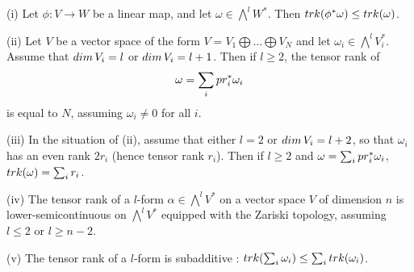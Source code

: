 \documentclass[10pt,a4paper]{amsart}
\begin{document}
\begin{lemm}\label{lerankprime} (i) Let $\phi: V\rightarrow W$ be a linear map, and let $\omega\in\bigwedge^l W^*$. Then ${\rm trk}(\phi^*\omega)\leq {\rm trk}(\omega)$.

(ii) Let $V$ be a vector space of the form $V=V_1\bigoplus \ldots\bigoplus V_N$ and let $\omega_i\in\bigwedge^lV_i^*$. Assume that ${\rm dim}\,V_i=l$ or ${\rm dim}\,V_i=l+1$. Then if $l\geq 2$, the tensor rank of \begin{eqnarray}\label{eqpouromegaprime} \omega=\sum_i{\rm pr}_i^*\omega_i\end{eqnarray} is equal to $N$, assuming $\omega_i\not=0$ for all $i$.

(iii)  In the situation of (ii), assume that either $l=2$ or ${\rm dim}\,V_i=l+2$, so that $\omega_i$ has an even rank $2r_i$ (hence tensor rank $r_i$). Then if $l\geq 2$  and  $ \omega=\sum_i{\rm pr}_i^*\omega_i$,   ${\rm trk}(\omega)=\sum_ir_i$.

(iv) The tensor rank of a $l$-form $\alpha\in \bigwedge^lV^* $ on  a vector space $V$ of dimension $n$ is lower-semicontinuous on $ \bigwedge^lV^* $ equipped with the Zariski topology, assuming $l\leq2$ or $l\geq n-2$.

(v) The tensor rank of a $l$-form is subadditive : ${\rm trk}(\sum_i\omega_i)\leq \sum_i{\rm trk}(\omega_i)$.
\end{lemm}
\end{document}
